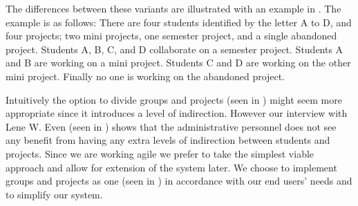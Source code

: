 The differences between these variants are illustrated with an example in .
The example is as follows:
There are four students identified by the letter A to D, and four projects; two mini projects, one semester project, and a single abandoned project.
Students A, B, C, and D collaborate on a semester project.
Students A and B are working on a mini project.
Students C and D are working on the other mini project.
Finally no one is working on the abandoned project.

Intuitively the option to divide groups and projects (seen in ) might seem more appropriate since it introduces a level of indirection.
However our interview with Lene W. Even (seen in ) shows that the administrative personnel does not see any benefit from having any extra levels of indirection between students and projects.
Since we are working agile we prefer to take the simplest viable approach and allow for extension of the system later.
We choose to implement groups and projects as one (seen in ) in accordance with our end users' needs and to simplify our system.





